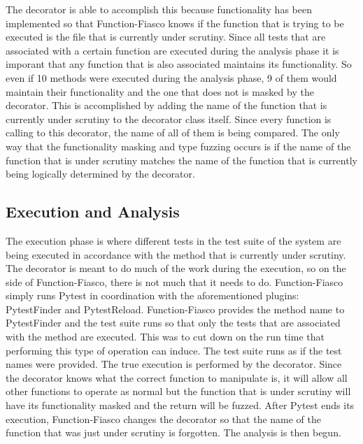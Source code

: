         The decorator is able to accomplish this because functionality has been implemented so that Function-Fiasco knows if the function that is trying to be executed is the file that is currently under scrutiny. Since all tests that are associated with a certain function are executed during the analysis phase it is imporant that any function that is also associated maintains its functionality. So even if 10 methods were executed during the analysis phase, 9 of them would maintain their functionality and the one that does not is masked by the decorator. This is accomplished by adding the name of the function that is currently under scrutiny to the decorator class itself. Since every function is calling to this decorator, the name of all of them is being compared. The only way that the functionality masking and type fuzzing occurs is if the name of the function that is under scrutiny matches the name of the function that is currently being logically determined by the decorator.

  \subsection{Execution and Analysis}
      The execution phase is where different tests in the test suite of the system are being executed in accordance with the method that is currently under scrutiny. The decorator is meant to do much of the work during the execution, so on the side of Function-Fiasco, there is not much that it needs to do. Function-Fiasco simply runs Pytest in coordination with the aforementioned plugins: PytestFinder and PytestReload. Function-Fiasco provides the method name to PytestFinder and the test suite runs so that only the tests that are associated with the method are executed. This was to cut down on the run time that performing this type of operation can induce. The test suite runs as if the test names were provided. The true execution is performed by the decorator. Since the decorator knows what the correct function to manipulate is, it will allow all other functions to operate as normal but the function that is under scrutiny will have its functionality masked and the return will be fuzzed. After Pytest ends its execution, Function-Fiasco changes the decorator so that the name of the function that was just under scrutiny is forgotten. The analysis is then begun.


